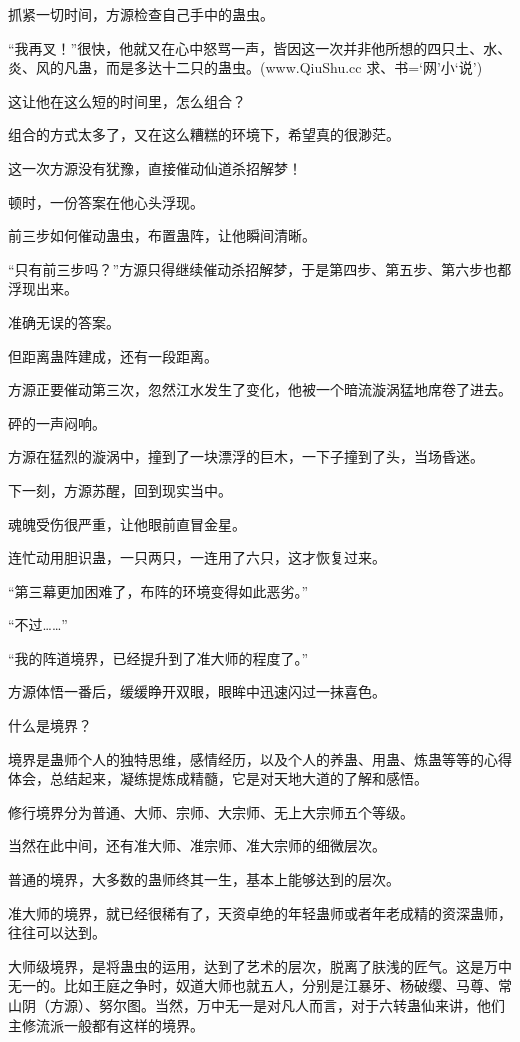 \begin{this_body}
抓紧一切时间，方源检查自己手中的蛊虫。

“我再叉！”很快，他就又在心中怒骂一声，皆因这一次并非他所想的四只土、水、炎、风的凡蛊，而是多达十二只的蛊虫。(www.QiuShu.cc 求、书=‘网’小‘说’)

这让他在这么短的时间里，怎么组合？

组合的方式太多了，又在这么糟糕的环境下，希望真的很渺茫。

这一次方源没有犹豫，直接催动仙道杀招解梦！

顿时，一份答案在他心头浮现。

前三步如何催动蛊虫，布置蛊阵，让他瞬间清晰。

“只有前三步吗？”方源只得继续催动杀招解梦，于是第四步、第五步、第六步也都浮现出来。

准确无误的答案。

但距离蛊阵建成，还有一段距离。

方源正要催动第三次，忽然江水发生了变化，他被一个暗流漩涡猛地席卷了进去。

砰的一声闷响。

方源在猛烈的漩涡中，撞到了一块漂浮的巨木，一下子撞到了头，当场昏迷。

下一刻，方源苏醒，回到现实当中。

魂魄受伤很严重，让他眼前直冒金星。

连忙动用胆识蛊，一只两只，一连用了六只，这才恢复过来。

“第三幕更加困难了，布阵的环境变得如此恶劣。”

“不过……”

“我的阵道境界，已经提升到了准大师的程度了。”

方源体悟一番后，缓缓睁开双眼，眼眸中迅速闪过一抹喜色。

什么是境界？

境界是蛊师个人的独特思维，感情经历，以及个人的养蛊、用蛊、炼蛊等等的心得体会，总结起来，凝练提炼成精髓，它是对天地大道的了解和感悟。

修行境界分为普通、大师、宗师、大宗师、无上大宗师五个等级。

当然在此中间，还有准大师、准宗师、准大宗师的细微层次。

普通的境界，大多数的蛊师终其一生，基本上能够达到的层次。

准大师的境界，就已经很稀有了，天资卓绝的年轻蛊师或者年老成精的资深蛊师，往往可以达到。

大师级境界，是将蛊虫的运用，达到了艺术的层次，脱离了肤浅的匠气。这是万中无一的。比如王庭之争时，奴道大师也就五人，分别是江暴牙、杨破缨、马尊、常山阴（方源）、努尔图。当然，万中无一是对凡人而言，对于六转蛊仙来讲，他们主修流派一般都有这样的境界。


\end{this_body}
